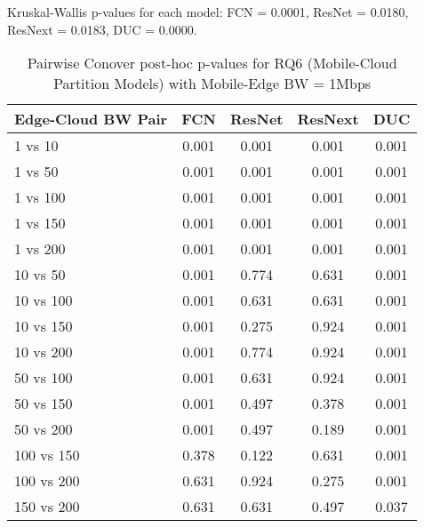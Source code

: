 \begin{table}[h]
\centering
\caption{Pairwise Conover post-hoc p-values for RQ6 (Mobile-Cloud Partition Models) with Mobile-Edge BW = 1Mbps}
\label{tab:conover_mobile_cloud_partition_me1}
\smallskip
Kruskal-Wallis p-values for each model: FCN = 0.0001, ResNet = 0.0180, ResNext = 0.0183, DUC = 0.0000.

\begin{tabular}{lcccc}
\toprule
Edge-Cloud BW Pair & FCN & ResNet & ResNext & DUC \\
\midrule
1 vs 10 & 0.001 & 0.001 & 0.001 & 0.001 \\
1 vs 50 & 0.001 & 0.001 & 0.001 & 0.001 \\
1 vs 100 & 0.001 & 0.001 & 0.001 & 0.001 \\
1 vs 150 & 0.001 & 0.001 & 0.001 & 0.001 \\
1 vs 200 & 0.001 & 0.001 & 0.001 & 0.001 \\
10 vs 50 & 0.001 & 0.774 & 0.631 & 0.001 \\
10 vs 100 & 0.001 & 0.631 & 0.631 & 0.001 \\
10 vs 150 & 0.001 & 0.275 & 0.924 & 0.001 \\
10 vs 200 & 0.001 & 0.774 & 0.924 & 0.001 \\
50 vs 100 & 0.001 & 0.631 & 0.924 & 0.001 \\
50 vs 150 & 0.001 & 0.497 & 0.378 & 0.001 \\
50 vs 200 & 0.001 & 0.497 & 0.189 & 0.001 \\
100 vs 150 & 0.378 & 0.122 & 0.631 & 0.001 \\
100 vs 200 & 0.631 & 0.924 & 0.275 & 0.001 \\
150 vs 200 & 0.631 & 0.631 & 0.497 & 0.037 \\
\bottomrule
\end{tabular}
\end{table}

